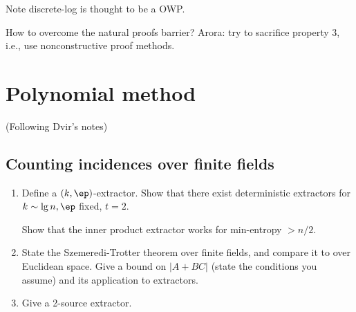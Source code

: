 Note discrete-log is thought to be a OWP. 

How to overcome the natural proofs barrier? Arora: try to sacrifice property 3, i.e., use nonconstructive proof methods.

\section{Polynomial method}
(Following Dvir's notes)
\subsection{}
\subsection{}
\subsection{Counting incidences over finite fields}
\begin{enumerate}
\item
Define a $(k,\ep)$-extractor. Show that there exist deterministic extractors for $k\sim \lg n, \ep$ fixed, $t=2$. 

Show that the inner product extractor works for min-entropy $>n/2$.
\item
State the Szemeredi-Trotter theorem over finite fields, and compare it to over Euclidean space. Give a bound on $|A+BC|$ (state the conditions you assume) and its application to extractors.
\item Give a 2-source extractor.
\end{enumerate}


